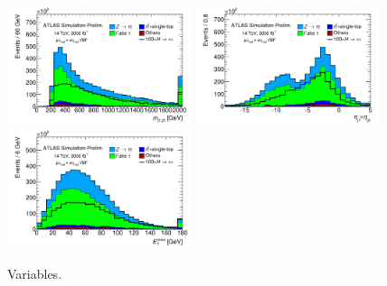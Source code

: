 \begin{figure}[tp]
  \includegraphics[width=0.48\textwidth]{figures/ATL-PHYS-PUB-2014-018/fig_03f}
  \includegraphics[width=0.48\textwidth]{figures/ATL-PHYS-PUB-2014-018/fig_03g}
  \includegraphics[width=0.48\textwidth]{figures/ATL-PHYS-PUB-2014-018/fig_03h}
  \caption{Variables.}
  \label{fig:prospects-hllhc-jets}
\end{figure}

